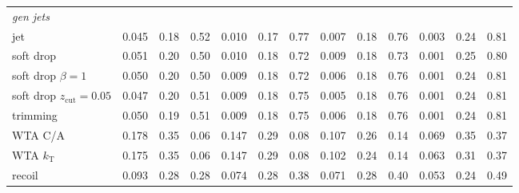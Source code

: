 \begin{table}[htbp]
\begin{tabular}{lcccccccccccc}
\midrule
\multicolumn{13}{l}{\emph{gen jets}} \\
jet & 0.045 & 0.18 & 0.52 & 0.010 & 0.17 & 0.77 & 0.007 & 0.18 & 0.76 & 0.003 & 0.24 & 0.81 \\
soft drop & 0.051 & 0.20 & 0.50 & 0.010 & 0.18 & 0.72 & 0.009 & 0.18 & 0.73 & 0.001 & 0.25 & 0.80 \\
soft drop $\beta=1$ & 0.050 & 0.20 & 0.50 & 0.009 & 0.18 & 0.72 & 0.006 & 0.18 & 0.76 & 0.001 & 0.24 & 0.81 \\
soft drop $z_\mathrm{cut}=0.05$ & 0.047 & 0.20 & 0.51 & 0.009 & 0.18 & 0.75 & 0.005 & 0.18 & 0.76 & 0.001 & 0.24 & 0.81 \\
trimming & 0.050 & 0.19 & 0.51 & 0.009 & 0.18 & 0.75 & 0.006 & 0.18 & 0.76 & 0.001 & 0.24 & 0.81 \\
WTA C/A & 0.178 & 0.35 & 0.06 & 0.147 & 0.29 & 0.08 & 0.107 & 0.26 & 0.14 & 0.069 & 0.35 & 0.37 \\
WTA $k_\mathrm{T}$ & 0.175 & 0.35 & 0.06 & 0.147 & 0.29 & 0.08 & 0.102 & 0.24 & 0.14 & 0.063 & 0.31 & 0.37 \\
recoil & 0.093 & 0.28 & 0.28 & 0.074 & 0.28 & 0.38 & 0.071 & 0.28 & 0.40 & 0.053 & 0.24 & 0.49 \\
\bottomrule
\end{tabular}
\end{table}
